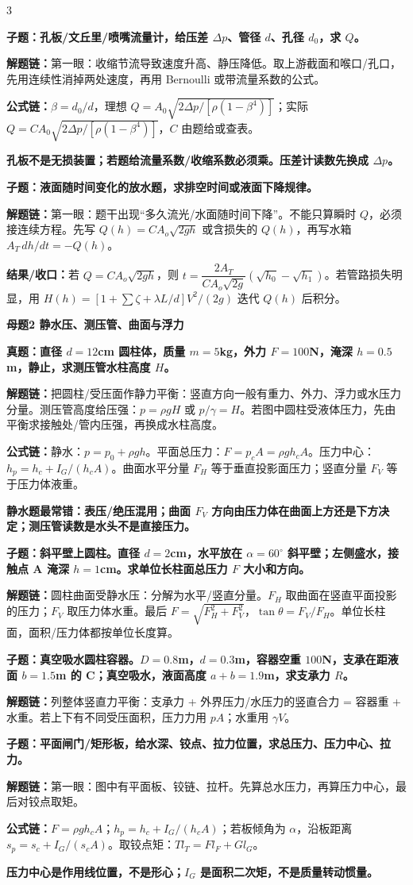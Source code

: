 \documentclass[a4paper]{article}
\newcommand{\mt}[1]{\vspace{2pt}\colorbox{M}{\parbox{\dimexpr\linewidth-2\fboxsep}{\color{white}\bfseries #1}}\par}
\newcommand{\qt}[1]{\vspace{1pt}\colorbox{Q}{\parbox{\dimexpr\linewidth-2\fboxsep}{\color{white}\bfseries #1}}\par}
\newcommand{\warn}[1]{\colorbox{Y}{\parbox{\dimexpr\linewidth-2\fboxsep}{\color{E}\bfseries #1}}\par}
\newcommand{\chain}[1]{{\color{A}\bfseries 解题链：}#1\par}
\newcommand{\res}[1]{{\color{E}\bfseries 结果/收口：}#1\par}
\newcommand{\form}[1]{{\color{M}\bfseries 公式链：}#1\par}
\begin{document}
\begin{multicols}{3}
\qt{子题：孔板/文丘里/喷嘴流量计，给压差 $\Delta p$、管径 $d$、孔径 $d_0$，求 $Q$。}
\chain{第一眼：收缩节流导致速度升高、静压降低。取上游截面和喉口/孔口，先用连续性消掉两处速度，再用 Bernoulli 或带流量系数的公式。}
\form{$\beta=d_0/d$，理想 $Q=A_0\sqrt{2\Delta p/[\rho(1-\beta^4)]}$；实际 $Q=C A_0\sqrt{2\Delta p/[\rho(1-\beta^4)]}$，$C$ 由题给或查表。}
\warn{孔板不是无损装置；若题给流量系数/收缩系数必须乘。压差计读数先换成 $\Delta p$。}

\qt{子题：液面随时间变化的放水题，求排空时间或液面下降规律。}
\chain{第一眼：题干出现“多久流光/水面随时间下降”。不能只算瞬时 $Q$，必须接连续方程。先写 $Q(h)=C A_o\sqrt{2gh}$ 或含损失的 $Q(h)$，再写水箱 $A_T\,dh/dt=-Q(h)$。}
\res{若 $Q=C A_o\sqrt{2gh}$，则 $t=\dfrac{2A_T}{C A_o\sqrt{2g}}\left(\sqrt{h_0}-\sqrt{h_1}\right)$。若管路损失明显，用 $H(h)=[1+\sum\zeta+\lambda L/d]V^2/(2g)$ 迭代 $Q(h)$ 后积分。}

\mt{母题2 静水压、测压管、曲面与浮力}
\qt{真题：直径 $d=12$cm 圆柱体，质量 $m=5$kg，外力 $F=100$N，淹深 $h=0.5$m，静止，求测压管水柱高度 $H$。}
\chain{把圆柱/受压面作静力平衡：竖直方向一般有重力、外力、浮力或水压力分量。测压管高度给压强：$p=\rho gH$ 或 $p/\gamma=H$。若图中圆柱受液体压力，先由平衡求接触处/管内压强，再换成水柱高度。}
\form{静水：$p=p_0+\rho gh$。平面总压力：$F=p_cA=\rho gh_cA$。压力中心：$h_p=h_c+I_G/(h_cA)$。曲面水平分量 $F_H$ 等于垂直投影面压力；竖直分量 $F_V$ 等于压力体液重。}
\warn{静水题最常错：表压/绝压混用；曲面 $F_V$ 方向由压力体在曲面上方还是下方决定；测压管读数是水头不是直接压力。}

\qt{子题：斜平壁上圆柱。直径 $d=2$cm，水平放在 $\alpha=60^\circ$ 斜平壁；左侧盛水，接触点 A 淹深 $h=1$cm。求单位长柱面总压力 $F$ 大小和方向。}
\chain{圆柱曲面受静水压：分解为水平/竖直分量。$F_H$ 取曲面在竖直平面投影的压力；$F_V$ 取压力体水重。最后 $F=\sqrt{F_H^2+F_V^2}$，$\tan\theta=F_V/F_H$。单位长柱面，面积/压力体都按单位长度算。}

\qt{子题：真空吸水圆柱容器。$D=0.8$m，$d=0.3$m，容器空重 $100$N，支承在距液面 $b=1.5$m 的 C；真空吸水，液面高度 $a+b=1.9$m，求支承力 $R$。}
\chain{列整体竖直力平衡：支承力 + 外界压力/水压力的竖直合力 = 容器重 + 水重。若上下有不同受压面积，压力力用 $pA$；水重用 $\gamma V$。}

\qt{子题：平面闸门/矩形板，给水深、铰点、拉力位置，求总压力、压力中心、拉力。}
\chain{第一眼：图中有平面板、铰链、拉杆。先算总水压力，再算压力中心，最后对铰点取矩。}
\form{$F=\rho gh_cA$；$h_p=h_c+I_G/(h_cA)$；若板倾角为 $\alpha$，沿板距离 $s_p=s_c+I_G/(s_cA)$。取铰点矩：$T l_T=F l_F+G l_G$。}
\warn{压力中心是作用线位置，不是形心；$I_G$ 是面积二次矩，不是质量转动惯量。}


\end{multicols}
\end{document}

